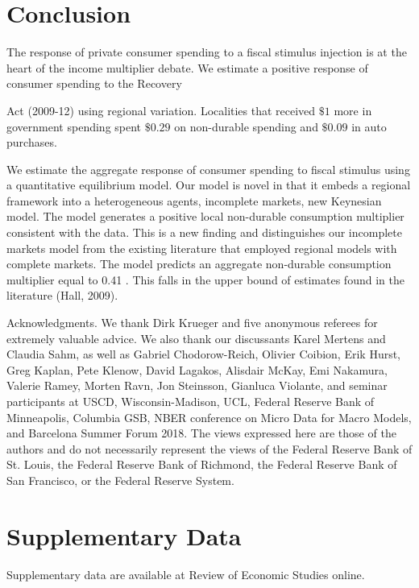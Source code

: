 \documentclass[\latexroot/\projectname]{subfiles}
\begin{document}
\section{Conclusion}\whenintegrated{\label{conclusion}}
\whenintegrated{\label{sec:conclusion}} %


The response of private consumer spending to a fiscal stimulus injection is at the heart of the income multiplier debate. We estimate a positive response of consumer spending to the Recovery

Act (2009-12) using regional variation. Localities that received $\$ 1$ more in government spending spent $\$ 0.29$ on non-durable spending and $\$ 0.09$ in auto purchases.

We estimate the aggregate response of consumer spending to fiscal stimulus using a quantitative equilibrium model. Our model is novel in that it embeds a regional framework into a heterogeneous agents, incomplete markets, new Keynesian model. The model generates a positive local non-durable consumption multiplier consistent with the data. This is a new finding and distinguishes our incomplete markets model from the existing literature that employed regional models with complete markets. The model predicts an aggregate non-durable consumption multiplier equal to 0.41 . This falls in the upper bound of estimates found in the literature (Hall, 2009).

Acknowledgments. We thank Dirk Krueger and five anonymous referees for extremely valuable advice. We also thank our discussants Karel Mertens and Claudia Sahm, as well as Gabriel Chodorow-Reich, Olivier Coibion, Erik Hurst, Greg Kaplan, Pete Klenow, David Lagakos, Alisdair McKay, Emi Nakamura, Valerie Ramey, Morten Ravn, Jon Steinsson, Gianluca Violante, and seminar participants at USCD, Wisconsin-Madison, UCL, Federal Reserve Bank of Minneapolis, Columbia GSB, NBER conference on Micro Data for Macro Models, and Barcelona Summer Forum 2018. The views expressed here are those of the authors and do not necessarily represent the views of the Federal Reserve Bank of St. Louis, the Federal Reserve Bank of Richmond, the Federal Reserve Bank of San Francisco, or the Federal Reserve System.

\section*{Supplementary Data}
Supplementary data are available at Review of Economic Studies online.
\end{document}
